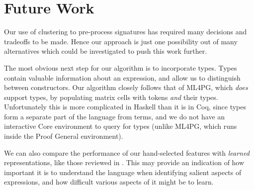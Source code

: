 \section{Future Work}
\label{sec:future}

Our use of clustering to pre-process \qspec{} signatures has required many decisions and tradeoffs to be made. Hence our approach is just one possibility out of many alternatives which could be investigated to push this work further.

The most obvious next step for our algorithm is to incorporate types. Types contain valuable information about an expression, and allow us to distinguish between constructors. Our algorithm closely follows that of ML4PG, which \emph{does} support types, by populating matrix cells with tokens \emph{and} their types. Unfortunately this is more complicated in Haskell than it is in Coq, since types form a separate part of the language from terms, and we do not have an interactive Core environment to query for types (unlike ML4PG, which runs inside the Proof General environment).

We can also compare the performance of our hand-selected features with \emph{learned} representations, like those reviewed in \cite{bengio2013representation}. This may provide an indication of how important it is to understand the language when identifying salient aspects of expressions, and how difficult various aspects of it might be to learn.
